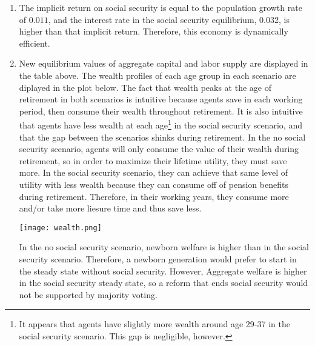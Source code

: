\documentclass{article}
\begin{document}
\begin{enumerate}
	\item The implicit return on social security is equal to the population growth rate of $0.011$, and the interest rate in the social security equilibrium, 0.032, is higher than that implicit return. Therefore, this economy is dynamically efficient.
	\item New equilibrium values of aggregate capital and labor supply are displayed in the table above. The wealth profiles of each age group in each scenario are diplayed in the plot below. The fact that wealth peaks at the age of retirement in both scenarios is intuitive because agents save in each working period, then consume their wealth throughout retirement. It is also intuitive that agents have less wealth at each age\footnote{It appears that agents have slightly more wealth around age 29-37 in the social security scenario. This gap is negligible, however.} in the social security scenario, and that the gap between the scenarios shinks during retirement. In the no social security scenario, agents will only consume the value of their wealth during retirement, so in order to maximize their lifetime utility, they must save more. In the social security scenario, they can achieve that same level of utility with less wealth because they can consume off of pension benefits during retirement. Therefore, in their working years, they consume more and/or take more liesure time and thus save less.
		\begin{center}
			\texttt{[image: wealth.png]}
		\end{center}
		In the no social security scenario, newborn welfare is higher than in the social security scenario. Therefore, a newborn generation would prefer to start in the steady state without social security. However, Aggregate welfare is higher in the social security steady state, so a reform that ends social security would not be supported by majority voting.
\end{enumerate}


\end{document}
